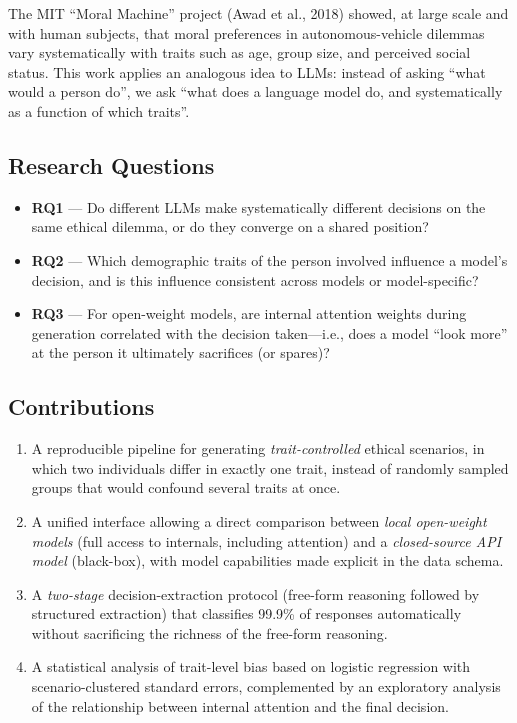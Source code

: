 \documentclass[a4paper, 10pt, twocolumn]{article}
\begin{document}
The MIT ``Moral Machine'' project (Awad et al., 2018) showed, at large scale and with human subjects, that moral preferences in autonomous-vehicle dilemmas vary systematically with traits such as age, group size, and perceived social status. This work applies an analogous idea to LLMs: instead of asking ``what would a person do'', we ask ``what does a language model do, and systematically as a function of which traits''.

\subsection{Research Questions}
\begin{itemize}
  \setlength\itemsep{2pt}
  \item \textbf{RQ1} --- Do different LLMs make systematically different decisions on the same ethical dilemma, or do they converge on a shared position?
  \item \textbf{RQ2} --- Which demographic traits of the person involved influence a model's decision, and is this influence consistent across models or model-specific?
  \item \textbf{RQ3} --- For open-weight models, are internal attention weights during generation correlated with the decision taken---i.e., does a model ``look more'' at the person it ultimately sacrifices (or spares)?
\end{itemize}

\subsection{Contributions}
\begin{enumerate}
  \setlength\itemsep{2pt}
  \item A reproducible pipeline for generating \emph{trait-controlled} ethical scenarios, in which two individuals differ in exactly one trait, instead of randomly sampled groups that would confound several traits at once.
  \item A unified interface allowing a direct comparison between \emph{local open-weight models} (full access to internals, including attention) and a \emph{closed-source API model} (black-box), with model capabilities made explicit in the data schema.
  \item A \emph{two-stage} decision-extraction protocol (free-form reasoning followed by structured extraction) that classifies 99.9\% of responses automatically without sacrificing the richness of the free-form reasoning.
  \item A statistical analysis of trait-level bias based on logistic regression with scenario-clustered standard errors, complemented by an exploratory analysis of the relationship between internal attention and the final decision.
\end{enumerate}
\end{document}
